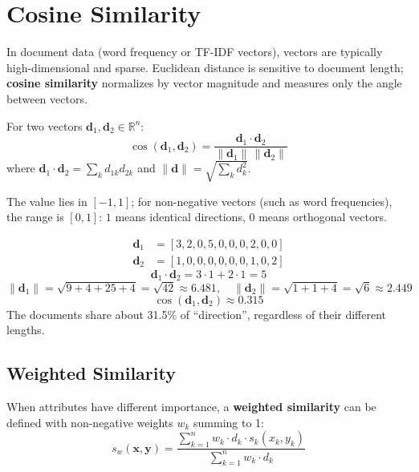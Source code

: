 \section{Cosine Similarity}
\label{sec:cosine}

In document data (word frequency or TF-IDF vectors), vectors are typically high-dimensional and sparse. Euclidean distance is sensitive to document length; \textbf{cosine similarity} normalizes by vector magnitude and measures only the angle between vectors.

\begin{definition}
For two vectors $\mathbf{d}_1, \mathbf{d}_2 \in \mathbb{R}^n$:
\begin{equation}
  \cos(\mathbf{d}_1, \mathbf{d}_2) = \frac{\mathbf{d}_1 \cdot \mathbf{d}_2}{\|\mathbf{d}_1\| \, \|\mathbf{d}_2\|}
  \label{eq:cosine}
\end{equation}
where $\mathbf{d}_1 \cdot \mathbf{d}_2 = \sum_k d_{1k} d_{2k}$ and $\|\mathbf{d}\| = \sqrt{\sum_k d_k^2}$.
\end{definition}

The value lies in $[-1, 1]$; for non-negative vectors (such as word frequencies), the range is $[0, 1]$: $1$ means identical directions, $0$ means orthogonal vectors.

\begin{example}
\begin{align*}
  \mathbf{d}_1 &= [3, 2, 0, 5, 0, 0, 0, 2, 0, 0] \\
  \mathbf{d}_2 &= [1, 0, 0, 0, 0, 0, 0, 1, 0, 2]
\end{align*}
\[
  \mathbf{d}_1 \cdot \mathbf{d}_2 = 3{\cdot}1 + 2{\cdot}1 = 5
\]
\[
  \|\mathbf{d}_1\| = \sqrt{9+4+25+4} = \sqrt{42} \approx 6.481, \quad
  \|\mathbf{d}_2\| = \sqrt{1+1+4} = \sqrt{6} \approx 2.449
\]
\[
  \cos(\mathbf{d}_1, \mathbf{d}_2) \approx 0.315
\]
The documents share about 31.5\% of ``direction'', regardless of their different lengths.
\end{example}

\subsection{Weighted Similarity}

When attributes have different importance, a \textbf{weighted similarity} can be defined with non-negative weights $w_k$ summing to 1:
\begin{equation}
  s_w(\mathbf{x}, \mathbf{y}) = \frac{\sum_{k=1}^{n} w_k \cdot d_k \cdot s_k(x_k, y_k)}{\sum_{k=1}^{n} w_k \cdot d_k}
\end{equation}

